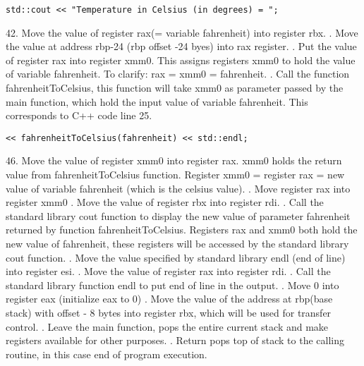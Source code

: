 \documentclass{article}
\theoremstyle{theorem}
\theoremstyle{definition}
\theoremstyle{remark}
\begin{document}
\begin{lstlisting}
std::cout << "Temperature in Celsius (in degrees) = ";
\end{lstlisting}
42. Move the value of register rax(= variable fahrenheit) into register rbx.
\newline {}. Move the value at address rbp-24 (rbp offset -24 byes) into rax register.
\newline {}. Put the value of register rax into register xmm0. This assigns registers xmm0 to hold the value of variable fahrenheit. To clarify: rax = xmm0 = fahrenheit.
\newline {}. Call the function fahrenheitToCelsius, this function will take xmm0 as parameter passed by the main function, which hold the input value of variable fahrenheit. This corresponds to C++ code line 25.
\begin{lstlisting}
<< fahrenheitToCelsius(fahrenheit) << std::endl;
\end{lstlisting}
46. Move the value of register xmm0 into register rax. xmm0 holds the return value from fahrenheitToCelsius function. Register xmm0 = register rax = new value of variable fahrenheit (which is the celsius value).
\newline {}. Move register rax into register xmm0
\newline {}. Move the value of register rbx into register rdi.
\newline {}. Call the standard library cout function to display the new value of parameter fahrenheit returned by function fahrenheitToCelsius. Registers rax and xmm0 both hold the new value of fahrenheit, these registers will be accessed by the standard library cout function.
\newline {}. Move the value specified by standard library endl (end of line) into register esi.
\newline {}. Move the value of register rax into register rdi.
\newline {}. Call the standard library function endl to put end of line in the output.
\newline {}. Move 0 into register eax (initialize eax to 0)
\newline {}. Move the value of the address at rbp(base stack) with offset - 8 bytes into register rbx, which will be used for transfer control.
\newline {}. Leave the main function, pops the entire current stack and make registers available for other purposes.
\newline {}. Return pops top of stack to the calling routine, in this case end of program execution.
\end{document}
